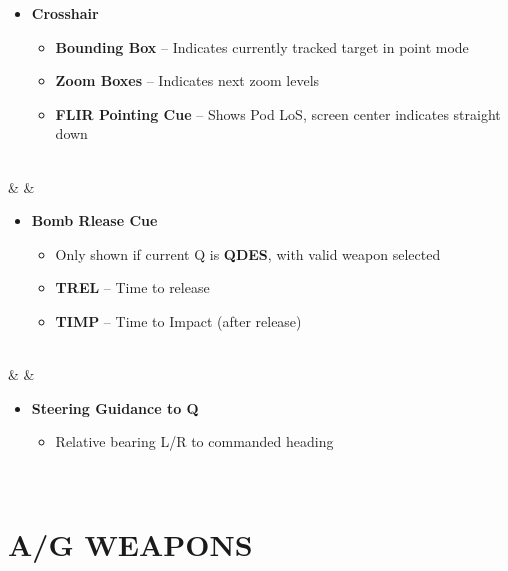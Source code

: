 \documentclass[fontInter]{TechCheck}
\begin{document}
\begin{listlongtable}
\begin{minipage}[t]{\linewidth}
\begin{itemize}
				\item \textbf{Crosshair}
				\begin{itemize}
					\item \textbf{Bounding Box} -- Indicates currently tracked target in point mode
					\item \textbf{Zoom Boxes} -- Indicates next zoom levels
					\item \textbf{FLIR Pointing Cue} -- Shows Pod LoS, screen center indicates straight down
				\end{itemize}
			\end{itemize}
		\end{minipage} \\
		\midrule
		\textbf{\textbullet} &  &
		\begin{minipage}[t]{\linewidth}
			\vspace{-7pt}
			\begin{itemize}
				\item \textbf{Bomb Rlease Cue}
				\begin{itemize}
					\item Only shown if current Q is \textbf{QDES}, with valid weapon selected
					\item \textbf{TREL} -- Time to release
					\item \textbf{TIMP} -- Time to Impact (after release)
				\end{itemize}
			\end{itemize}
		\end{minipage} \\
		\midrule
		\textbf{\textbullet} &  &
		\begin{minipage}[t]{\linewidth}
			\vspace{-7pt}
			\begin{itemize}
				\item \textbf{Steering Guidance to Q}
				\begin{itemize}
					\item Relative bearing L/R to commanded heading
				\end{itemize}
			\end{itemize}
		\end{minipage} \\
	\end{listlongtable}

	\cleardoublepage

	\chapter{A/G WEAPONS}
	\minitoc
	\cleardoublepage
\end{document}
